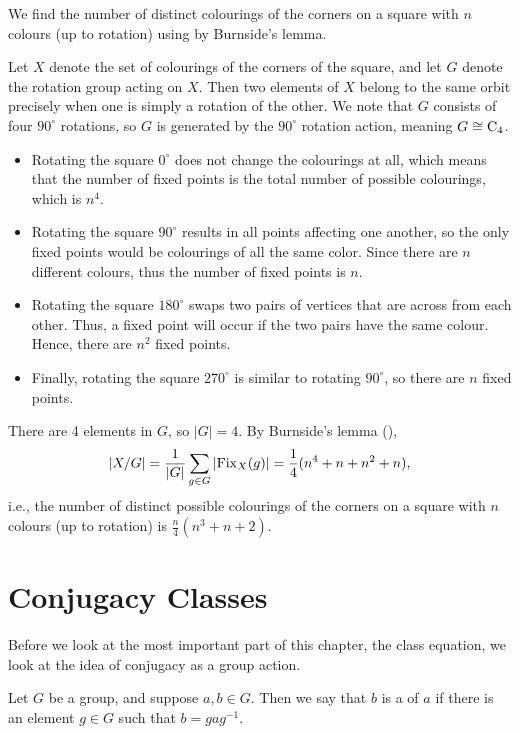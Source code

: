 \begin{example}
    We find the number of distinct colourings of the corners on a square with $n$ colours (up to rotation) using by Burnside's lemma.

    \begin{figure}[H]
	    \centering
	\end{figure}

    Let $X$ denote the set of colourings of the corners of the square, and let $G$ denote the rotation group acting on $X$. Then two elements of $X$ belong to the same orbit precisely when one is simply a rotation of the other. We note that $G$ consists of four $90^\circ$ rotations, so $G$ is generated by the $90^\circ$ rotation action, meaning $G \cong \mathrm{C}_{4}$.
    \begin{itemize}
        \item Rotating the square $0^\circ$ does not change the colourings at all, which means that the number of fixed points is the total number of possible colourings, which is $n^4$.
        \item Rotating the square $90^\circ$ results in all points affecting one another, so the only fixed points would be colourings of all the same color. Since there are $n$ different colours, thus the number of fixed points is $n$.
        \item Rotating the square $180^\circ$ swaps two pairs of vertices that are across from each other. Thus, a fixed point will occur if the two pairs have the same colour. Hence, there are $n^2$ fixed points.
        \item Finally, rotating the square $270^\circ$ is similar to rotating $90^\circ$, so there are $n$ fixed points.
    \end{itemize}
    There are 4 elements in $G$, so $|G| = 4$. By Burnside's lemma (),
    \[
        |X/G| = \frac{1}{|G|}\sum_{g\in G} |\mathrm{Fix}_{X}(g)| = \frac14 (n^4 + n + n^2 + n),
    \]
    i.e., the number of distinct possible colourings of the corners on a square with $n$ colours (up to rotation) is $\frac n4 (n^3 + n + 2)$.
\end{example}

\section{Conjugacy Classes}
Before we look at the most important part of this chapter, the class equation, we look at the idea of conjugacy as a group action.
\begin{definition}
    Let $G$ be a group, and suppose $a, b \in G$. Then we say that $b$ is a  of $a$ if there is an element $g \in G$ such that $b = gag^{-1}$.
\end{definition}

